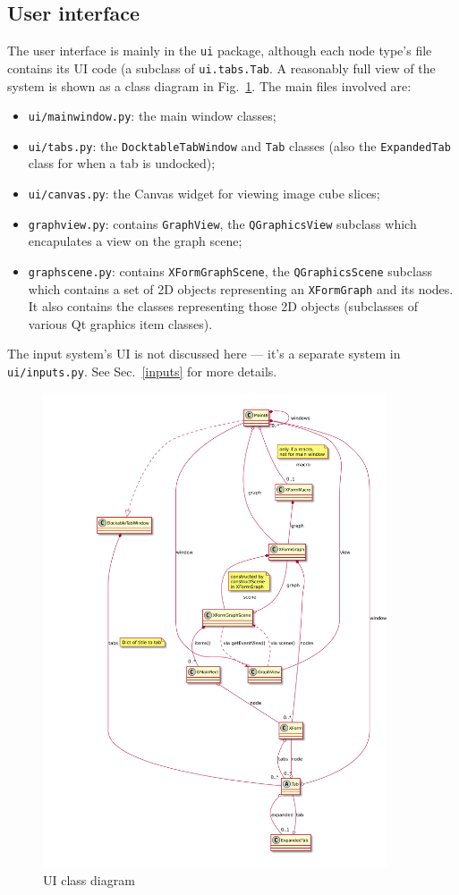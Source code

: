 \subsection{User interface}
The user interface is mainly in the \texttt{ui} package, although each
node type's file contains its UI code (a subclass of \texttt{ui.tabs.Tab}.
A reasonably full view of the system is shown as a class diagram
in Fig.~\ref{ui.pdf}.
The main files involved are:
\begin{itemize}
\item \texttt{ui/mainwindow.py}: the main window classes;
\item \texttt{ui/tabs.py}: the \texttt{DocktableTabWindow} and \texttt{Tab}
classes (also the \texttt{ExpandedTab} class for when a tab is undocked);
\item \texttt{ui/canvas.py}: the Canvas widget for viewing image cube slices;
\item \texttt{graphview.py}: contains \texttt{GraphView}, the
\texttt{QGraphicsView} subclass which encapulates a view on the graph scene;
\item \texttt{graphscene.py}: contains \texttt{XFormGraphScene},
the \texttt{QGraphicsScene} subclass which contains a set of 2D objects
representing an \texttt{XFormGraph} and its nodes. It also contains the
classes representing those 2D objects (subclasses of various Qt graphics item
classes).
\end{itemize}
The input system's UI is not discussed here --- it's a separate
system in \texttt{ui/inputs.py}. See Sec.~\ref{inputs} for more details.


\begin{figure}[ht]
\center
\includegraphics[width=4in]{ui.pdf}
\caption{UI class diagram}
\label{ui.pdf}
\end{figure}


